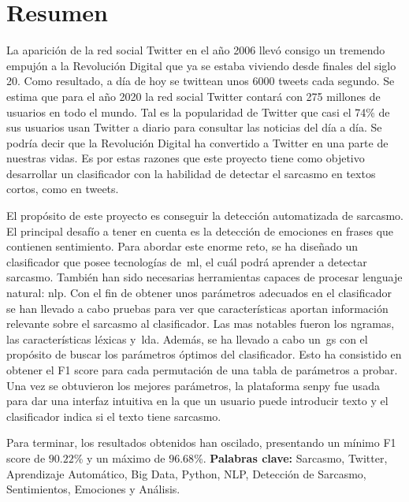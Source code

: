 \cleardoublepage
{}
\chapter*{Resumen}
 La aparición de la red social Twitter en el año 2006 llevó consigo un tremendo empujón a la Revolución Digital que ya se estaba viviendo desde finales del siglo 20. Como resultado, a día de hoy se twittean unos 6000 tweets cada segundo. Se estima que para el año 2020 la red social Twitter contará con 275 millones de usuarios en todo el mundo. Tal es la popularidad de Twitter que casi el 74\% de sus usuarios usan Twitter a diario para consultar las noticias del día a día. Se podría decir que la Revolución Digital ha convertido a Twitter en una parte de nuestras vidas. Es por estas razones que este proyecto tiene como objetivo desarrollar un clasificador con la habilidad de detectar el sarcasmo en textos cortos, como en tweets.\par
 El propósito de este proyecto es conseguir la detección automatizada de sarcasmo. El principal desafío a tener en cuenta es la detección de emociones en frases que contienen sentimiento. Para abordar este enorme reto, se ha diseñado un clasificador que posee tecnologías de~\acl{ml}, el cuál podrá aprender a detectar sarcasmo. También han sido necesarias herramientas capaces de procesar lenguaje natural: \acl{nlp}. Con el fin de obtener unos parámetros adecuados en el clasificador se han llevado a cabo pruebas para ver que características aportan información relevante sobre el sarcasmo al clasificador. Las mas notables fueron los ngramas, las características léxicas y~\acf{lda}. Además, se ha llevado a cabo un~\acl{gs} con el propósito de buscar los parámetros óptimos del clasificador. Esto ha consistido en obtener el F1 score para cada permutación de una tabla de parámetros a probar. Una vez se obtuvieron los mejores parámetros, la plataforma senpy fue usada para dar una interfaz intuitiva en la que un usuario puede introducir texto y el clasificador indica si el texto tiene sarcasmo.\par
 Para terminar, los resultados obtenidos han oscilado, presentando un mínimo F1 score de $90.22$\% y un máximo de $96.68$\%. 
\vfill
\textbf{Palabras clave:} Sarcasmo, Twitter, Aprendizaje Automático, Big Data, Python, NLP, Detección de Sarcasmo, Sentimientos, Emociones y Análisis. 